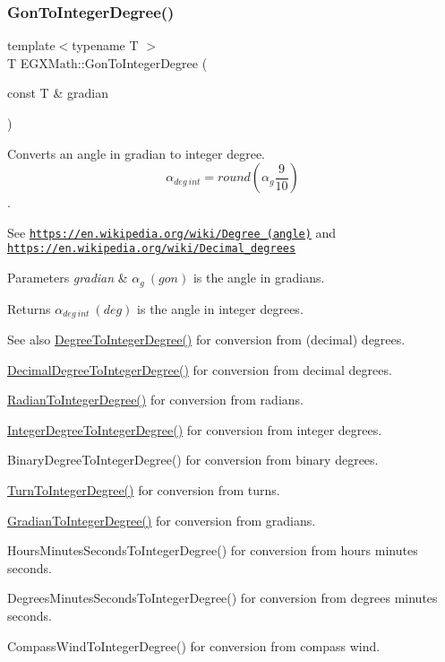 \subsubsection{\texorpdfstring{Gon\+To\+Integer\+Degree()}{GonToIntegerDegree()}}
{\footnotesize\ttfamily template$<$typename T $>$ \\
T E\+G\+X\+Math\+::\+Gon\+To\+Integer\+Degree (\begin{DoxyParamCaption}\item[{const T \&}]{gradian }\end{DoxyParamCaption})}



Converts an angle in gradian to integer degree. \[\alpha_{deg\ int}=round(\alpha_{g}\frac{9}{10})\]. 

See \href{https://en.wikipedia.org/wiki/Degree_(angle)}{\tt https\+://en.\+wikipedia.\+org/wiki/\+Degree\+\_\+(angle)} and \href{https://en.wikipedia.org/wiki/Decimal_degrees}{\tt https\+://en.\+wikipedia.\+org/wiki/\+Decimal\+\_\+degrees} 
\begin{DoxyParams}{Parameters}
{\em gradian} & $\alpha_{g}\ (gon)$ is the angle in gradians. \\
\hline
\end{DoxyParams}
\begin{DoxyReturn}{Returns}
$\alpha_{deg\ int}\ (deg)$ is the angle in integer degrees. 
\end{DoxyReturn}
\begin{DoxySeeAlso}{See also}
\mbox{\hyperlink{group___e_g_x_math-_angle_conversions-_degree_gaabd20f21be3c18ee423d0bc1a677c6f6}{Degree\+To\+Integer\+Degree()}} for conversion from (decimal) degrees. 

\mbox{\hyperlink{group___e_g_x_math-_angle_conversions-_decimal_degree_ga115239ea7202dbc6a6c9fba68e0ac189}{Decimal\+Degree\+To\+Integer\+Degree()}} for conversion from decimal degrees. 

\mbox{\hyperlink{group___e_g_x_math-_angle_conversions-_radian_gac84796dfdeb56235e1e338522a5f9350}{Radian\+To\+Integer\+Degree()}} for conversion from radians. 

\mbox{\hyperlink{group___e_g_x_math-_angle_conversions-_integer_degree_gac9e870bdfa60dd2bb61469fdf6eedd7c}{Integer\+Degree\+To\+Integer\+Degree()}} for conversion from integer degrees. 

Binary\+Degree\+To\+Integer\+Degree() for conversion from binary degrees. 

\mbox{\hyperlink{group___e_g_x_math-_angle_conversions-_turn_ga999085c62490997da870618e20e88ebb}{Turn\+To\+Integer\+Degree()}} for conversion from turns. 

\mbox{\hyperlink{group___e_g_x_math-_angle_conversions-_gradian_ga555aae885f8a7d0876a36aa07cbbd816}{Gradian\+To\+Integer\+Degree()}} for conversion from gradians. 

Hours\+Minutes\+Seconds\+To\+Integer\+Degree() for conversion from hours minutes seconds. 

Degrees\+Minutes\+Seconds\+To\+Integer\+Degree() for conversion from degrees minutes seconds. 

Compass\+Wind\+To\+Integer\+Degree() for conversion from compass wind. 
\end{DoxySeeAlso}

